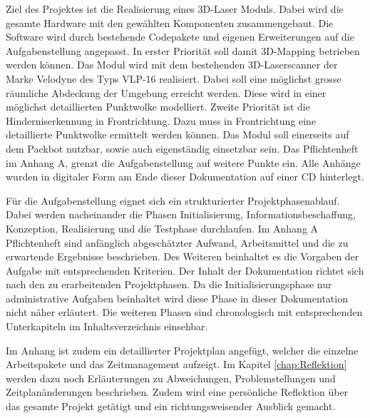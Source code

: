 Ziel des Projektes ist die Realisierung eines 3D-Laser Moduls. Dabei wird die gesamte Hardware mit den gewählten Komponenten zusammengebaut. Die Software wird durch bestehende Codepakete und eigenen Erweiterungen auf die Aufgabenstellung angepasst. In erster Priorität soll damit 3D-Mapping betrieben werden können. Das Modul wird mit dem bestehenden 3D-Laserscanner der Marke Velodyne des Typs VLP-16 realisiert. Dabei soll eine möglichst grosse räumliche Abdeckung der Umgebung erreicht werden. Diese wird in einer möglichst detaillierten Punktwolke modelliert. Zweite Priorität ist die Hinderniserkennung in Frontrichtung. Dazu muss in Frontrichtung eine detaillierte Punktwolke ermittelt werden können. Das Modul soll einerseits auf dem Packbot nutzbar, sowie auch eigenständig einsetzbar sein. Das Pflichtenheft im Anhang A, grenzt die Aufgabenstellung auf weitere Punkte ein. Alle Anhänge wurden in digitaler Form am Ende dieser Dokumentation auf einer CD hinterlegt. 

Für die Aufgabenstellung eignet sich ein strukturierter Projektphasenablauf. Dabei werden nacheinander die Phasen Initialisierung, Informationsbeschaffung, Konzeption, Realisierung und die Testphase durchlaufen. Im Anhang A Pflichtenheft sind anfänglich abgeschätzter Aufwand, Arbeitsmittel und die zu erwartende Ergebnisse beschrieben. Des Weiteren beinhaltet es die Vorgaben der Aufgabe mit entsprechenden Kriterien.
Der Inhalt der Dokumentation richtet sich nach den zu erarbeitenden Projektphasen. Da die Initialisierungsphase nur administrative Aufgaben beinhaltet wird diese Phase in dieser Dokumentation nicht näher erläutert. Die weiteren Phasen sind chronologisch mit entsprechenden Unterkapiteln im Inhaltsverzeichnis einsehbar. 

Im Anhang ist zudem ein detaillierter Projektplan angefügt, welcher die einzelne Arbeitspakete und das Zeitmanagement aufzeigt. Im Kapitel \ref{chap:Reflektion} werden dazu noch Erläuterungen zu Abweichungen, Problemstellungen und Zeitplanänderungen beschrieben. Zudem wird eine persönliche Reflektion über das gesamte Projekt getätigt und ein richtungsweisender Ausblick gemacht. 







